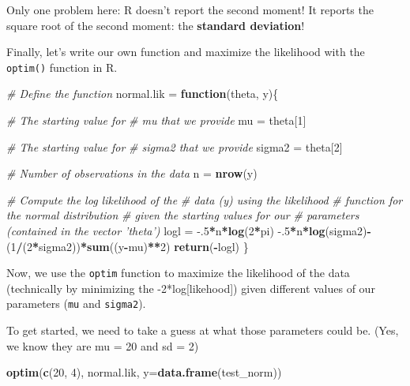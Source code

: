 \documentclass[
]{book}
\newenvironment{Shaded}{\begin{snugshade}}{\end{snugshade}}
\newcommand{\CommentTok}[1]{\textcolor[rgb]{0.56,0.35,0.01}{\textit{#1}}}
\newcommand{\ControlFlowTok}[1]{\textcolor[rgb]{0.13,0.29,0.53}{\textbf{#1}}}
\newcommand{\DataTypeTok}[1]{\textcolor[rgb]{0.13,0.29,0.53}{#1}}
\newcommand{\DecValTok}[1]{\textcolor[rgb]{0.00,0.00,0.81}{#1}}
\newcommand{\FloatTok}[1]{\textcolor[rgb]{0.00,0.00,0.81}{#1}}
\newcommand{\KeywordTok}[1]{\textcolor[rgb]{0.13,0.29,0.53}{\textbf{#1}}}
\newcommand{\NormalTok}[1]{#1}
\newcommand{\OperatorTok}[1]{\textcolor[rgb]{0.81,0.36,0.00}{\textbf{#1}}}
\newcommand{\StringTok}[1]{\textcolor[rgb]{0.31,0.60,0.02}{#1}}
\begin{document}
Only one problem here: R doesn't report the second moment! It reports
the square root of the second moment: the \textbf{standard deviation}!

Finally, let's write our own function and maximize the likelihood with the \texttt{optim()} function in R.

\begin{Shaded}
\begin{Highlighting}[]
\CommentTok{# Define the function}
\NormalTok{normal.lik =}\StringTok{ }\ControlFlowTok{function}\NormalTok{(theta, y)\{}
  
  \CommentTok{# The starting value for}
  \CommentTok{# mu that we provide}
\NormalTok{  mu =}\StringTok{ }\NormalTok{theta[}\DecValTok{1}\NormalTok{]}
  
  \CommentTok{# The starting value for}
  \CommentTok{# sigma2 that we provide}
\NormalTok{  sigma2 =}\StringTok{ }\NormalTok{theta[}\DecValTok{2}\NormalTok{]}
  
  \CommentTok{# Number of observations in the data}
\NormalTok{  n =}\StringTok{ }\KeywordTok{nrow}\NormalTok{(y)}
  
  \CommentTok{# Compute the log likelihood of the}
  \CommentTok{# data (y) using the likelihood}
  \CommentTok{# function for the normal distribution}
  \CommentTok{# given the starting values for our}
  \CommentTok{# parameters (contained in the vector 'theta')}
\NormalTok{  logl =}\StringTok{ }\FloatTok{-.5}\OperatorTok{*}\NormalTok{n}\OperatorTok{*}\KeywordTok{log}\NormalTok{(}\DecValTok{2}\OperatorTok{*}\NormalTok{pi) }\FloatTok{-.5}\OperatorTok{*}\NormalTok{n}\OperatorTok{*}\KeywordTok{log}\NormalTok{(sigma2)}\OperatorTok{-}\NormalTok{(}\DecValTok{1}\OperatorTok{/}\NormalTok{(}\DecValTok{2}\OperatorTok{*}\NormalTok{sigma2))}\OperatorTok{*}\KeywordTok{sum}\NormalTok{((y}\OperatorTok{-}\NormalTok{mu)}\OperatorTok{**}\DecValTok{2}\NormalTok{)}
  \KeywordTok{return}\NormalTok{(}\OperatorTok{-}\NormalTok{logl)}
\NormalTok{\}}
\end{Highlighting}
\end{Shaded}

Now, we use the \texttt{optim} function to maximize the likelihood of the data
(technically by minimizing the -2*log{[}likehood{]}) given different values of
our parameters (\texttt{mu} and \texttt{sigma2}).

To get started, we need to take a guess at what those parameters could be. (Yes, we know they are mu = 20 and sd = 2)

\begin{Shaded}
\begin{Highlighting}[]
\KeywordTok{optim}\NormalTok{(}\KeywordTok{c}\NormalTok{(}\DecValTok{20}\NormalTok{, }\DecValTok{4}\NormalTok{), normal.lik, }\DataTypeTok{y=}\KeywordTok{data.frame}\NormalTok{(test_norm))}
\end{Highlighting}
\end{Shaded}
\end{document}
